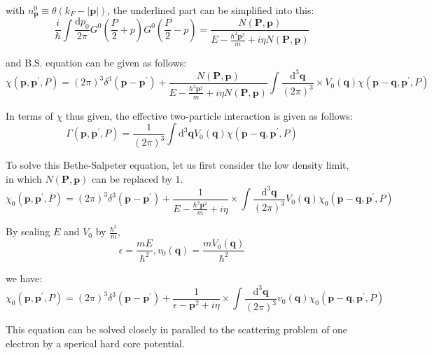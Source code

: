 with $n_\mathbf{p}^0 \equiv \theta(k_F-|\mathbf{p}|)$, the underlined part can be simplified into this:
\[ \frac{i}{\hbar} \int \frac{\mathrm{d}p_0}{2\pi}G^0(\frac{P}{2}+p)G^0(\frac{P}{2}-p) = \frac{N(\mathbf{P},\mathbf{p})}{E-\frac{\hbar^2\mathbf{p}^2}{m}+i\eta N(\mathbf{P},\mathbf{p})} \]

and B.S. equation can be given as follows:
\begin{equation} \label{Eqs2.7.16}
\chi(\mathbf{p},\mathbf{p}^{'},P) = (2\pi)^3 \delta^3(\mathbf{p}-\mathbf{p}^{'}) + \frac{N(\mathbf{P},\mathbf{p})}{E-\frac{\hbar^2\mathbf{p}^2}{m}+i\eta N(\mathbf{P},\mathbf{p})}\int \frac{\mathrm{d}^3 \mathbf{q}}{(2\pi)^3} \times V_0(\mathbf{q})\chi(\mathbf{p}-\mathbf{q},\mathbf{p}^{'},P) \end{equation}

In terms of $\chi$ thus given, the effective two-particle interaction is given as follows:
\begin{equation} \label{Eqs2.7.17}
\Gamma(\mathbf{p},\mathbf{p}^{'},P) = \frac{1}{(2\pi)^3} \int \mathrm{d}^3 \mathbf{q} V_0(\mathbf{q}) \chi(\mathbf{p}-\mathbf{q},\mathbf{p}^{'},P) \end{equation}

To solve this Bethe-Salpeter equation, let us first consider the low density limit, in which $N(\mathbf{P},\mathbf{p})$ can be replaced by $1$.
\begin{equation} \label{Eqs2.7.18}
\chi_0(\mathbf{p},\mathbf{p}^{'},P) = (2\pi)^3 \delta^3(\mathbf{p}-\mathbf{p}^{'}) + \frac{1}{E-\frac{\hbar^2\mathbf{p}^2}{m}+i\eta}\times \int \frac{\mathrm{d}^3\mathbf{q}}{(2\pi)^3}V_0(\mathbf{q})\chi_0(\mathbf{p}-\mathbf{q},\mathbf{p}^{'},P) \end{equation}

By scaling $E$ and $V_0$ by $\frac{\hbar^2}{m}$,
\begin{equation} \label{Eqs2.7.19}
\epsilon = \frac{mE}{\hbar^2}, v_0(\mathbf{q}) = \frac{m V_0(\mathbf{q})}{\hbar^2} \end{equation}

we have:
\begin{equation*} \label{Eqs2.7.18'} \tag{2.7.18'}
\chi_0(\mathbf{p},\mathbf{p}^{'},P) = (2\pi)^3\delta^3(\mathbf{p}-\mathbf{p}^{'}) + \frac{1}{\epsilon-\mathbf{p}^2+i\eta}\times\int\frac{\mathrm{d}^3\mathbf{q}}{(2\pi)^3}v_0(\mathbf{q}) \chi_0(\mathbf{p}-\mathbf{q},\mathbf{p}^{'},P)
\end{equation*}

This equation can be solved closely in paralled to the scattering problem of one electron by a sperical hard core potential.

